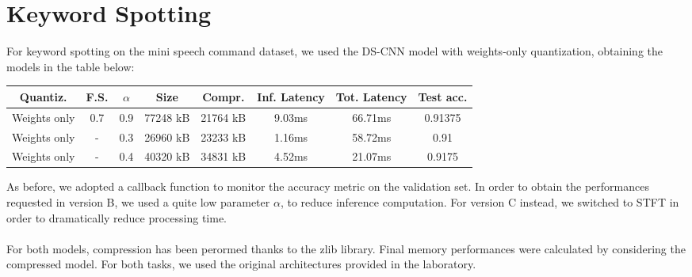 \documentclass{article}
\begin{document}
\vspace{0.1cm}

\section{Keyword Spotting}

For keyword spotting on the mini speech command dataset, we used the DS-CNN model with weights-only quantization, obtaining the models in the table below:
\\
\begin{center}
\begin{tabular}{ |c|c|c|c|c|c|c|c| }
\hline
\textbf{Quantiz.} &\textbf{F.S.} & \textbf{$\alpha$} &\textbf{Size} &\textbf{Compr.}&  \textbf{Inf. Latency}& \textbf{Tot. Latency} &\textbf{Test acc.}\\
\hline
Weights only & 0.7 & 0.9 & 77248 kB & 21764 kB & 9.03ms&   66.71ms & 0.91375 \\ 
Weights only & - &  0.3  & 26960 kB & 23233 kB  &  1.16ms& 58.72ms & 0.91 \\ 
Weights only & - &  0.4  & 40320 kB & 34831 kB  & 4.52ms & 21.07ms & 0.9175 \\ 

\hline
\end{tabular}
\end{center}

\vspace{0.5cm}

As before, we adopted a callback function to monitor the accuracy metric on the validation set.
In order to obtain the performances requested in version B, we used a quite low parameter $\alpha$, to reduce inference computation. For version C instead, we switched to STFT in order to dramatically reduce processing time.
\\\\
For both models, compression has been perormed thanks to the zlib library. Final memory performances were calculated by considering the compressed model.
For both tasks, we used the original architectures provided in the laboratory.
\end{document}
